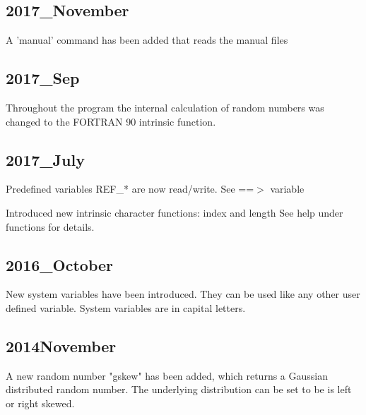 \subsection*{2017\_November}
\par
A 'manual' command has been added that reads the manual files 
\subsection*{2017\_Sep}
\par
Throughout the program the internal calculation of random numbers 
was changed to the FORTRAN 90 intrinsic function. 
\subsection*{2017\_July}
\par
Predefined variables REF\_* are now read/write. See ==$> $ variable 
\par
Introduced new intrinsic character functions: index and length 
See help under functions for details. 
\subsection*{2016\_October}
\par
New system variables have been introduced. They can be used like any 
other user defined variable. System variables are in capital letters. 
\subsection*{2014November}
\par
A new random number "gskew" has been added, which returns a 
Gaussian distributed random number. The underlying distribution 
can be set to be is left or right skewed. 
